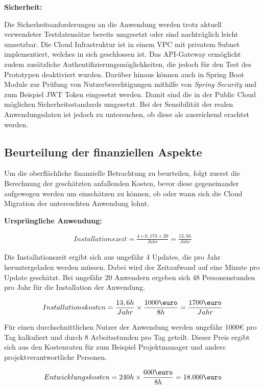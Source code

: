 \textbf{Sicherheit:}

Die Sicherheitsanforderungen an die Anwendung werden trotz aktuell verwendeter Testdatensätze bereits umgesetzt oder sind nachträglich leicht umsetzbar. Die Cloud Infrastruktur ist in einem \ac{VPC} mit privatem Subnet implementiert, welches in sich geschlossen ist. Das API-Gateway ermöglicht zudem zusätzliche Authentifizierungsmöglichkeiten, die jedoch für den Test des Prototypen deaktiviert wurden. Darüber hinaus können auch in \gls{Spring Boot} Module zur Prüfung von Nutzerberechtigungen mithilfe von \textit{Spring Security} und zum Beispiel JWT Token eingesetzt werden. Damit sind die in der Public Cloud möglichen Sicherheitsstandards umgesetzt. Bei der Sensibilität der realen Anwendungsdaten ist jedoch zu untersuchen, ob diese als ausreichend erachtet werden.

\subsection{Beurteilung der finanziellen Aspekte}
Um die oberflächliche finanzielle Betrachtung zu beurteilen, folgt zuerst die Berechnung der geschätzten anfallenden Kosten, bevor diese gegeneinander aufgewogen werden um einschätzen zu können, ob oder wann sich die Cloud Migration der untersuchten Anwendung lohnt.

\textbf{Ursprüngliche Anwendung:}

\begin{align}
    Installationszeit = \frac{4 \times 0,17h \times 20}{Jahr} = \frac{13,6h}{Jahr}
\end{align}

Die Installationszeit ergibt sich aus ungefähr 4 Updates, die pro Jahr heruntergeladen werden müssen. Dabei wird der Zeitaufwand auf eine Minute pro Update geschätzt. Bei ungefähr 20 Anwendern ergeben sich 48 Personenstunden pro Jahr für die Installation der Anwendung.

\begin{align}
    Installationskosten = \frac{13,6h}{Jahr} \times \frac{1000\mbox{\euro}}{8h} =\frac{1700\mbox{\euro}}{Jahr}
\end{align}

Für einen durchschnittlichen Nutzer der Anwendung werden ungefähr 1000€ pro Tag kalkuliert und durch 8 Arbeitsstunden pro Tag geteilt. Dieser Preis ergibt sich aus den Kostenraten für zum Beispiel Projektmanager und andere projektverantwortliche Personen. \pagebreak

\begin{align}
    Entwicklungskosten = 240h \times \frac{600\mbox{\euro}}{8h} = 18.000\mbox{\euro}
\end{align}

